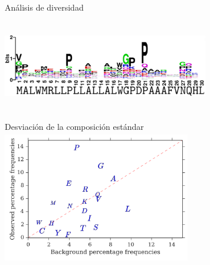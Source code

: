 \documentclass{beamer}
\begin{document}

\begin{frame}{Análisis de diversidad}
\centering
\begin{adjustwidth}{-1.5em}{-2.5em}
\includegraphics[width=340px,height=150px]{../img/logoInitial.png}\\ 
\end{adjustwidth}
\end{frame}











% 
\begin{frame}{Desviación de la composición estándar}
\centering
\includegraphics[width=310px,height=220px]{../img/frequenciesComparison.png}\\ 
\end{frame}
\end{document}
